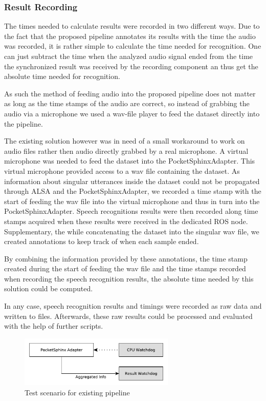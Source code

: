 \subsubsection{Result Recording}

The times needed to calculate results were recorded in two different ways.
Due to the fact that the proposed pipeline annotates its results with the time the audio was recorded, it is rather simple to calculate the time needed for recognition.
One can just subtract the time when the analyzed audio signal ended from the time the synchronized result was received by the recording component an thus get the absolute time needed for recognition.

As such the method of feeding audio into the proposed pipeline does not matter as long as the time stamps of the audio are correct, so instead of grabbing the audio via a microphone we used a wav-file player to feed the dataset directly into the pipeline.

The existing solution however was in need of a small workaround to work on audio files rather then audio directly grabbed by a real microphone.
A virtual microphone was needed to feed the dataset into the PocketSphinxAdapter.
This virtual microphone provided access to a wav file containing the dataset. 
As information about singular utterances inside the dataset could not be propagated through ALSA and the PocketSphinxAdapter, we recorded a time stamp with the start of feeding the wav file into the virtual microphone and thus in turn into the PocketSphinxAdapter.
Speech recognitions results were then recorded along time stamps acquired when these results were received in the dedicated ROS node.
Supplementary, the while concatenating the dataset into the singular wav file, we created annotations to keep track of when each sample ended.

By combining the information provided by these annotations, the time stamp created during the start of feeding the wav file and the time stamps recorded when recording the speech recognition results, the absolute time needed by this solution could be computed.

In any case, speech recognition results and timings were recorded as raw data and written to files.
Afterwards, these raw results could be processed and evaluated with the help of further scripts.


\begin{figure}[ht]
	\centering
	\includegraphics[width=0.66\textwidth]{diagrams/eval_pipeline_1.pdf}
	\caption{Test scenario for existing pipeline}
	\label{pic:eval_p1_diag}
\end{figure}

